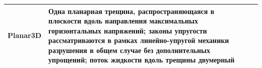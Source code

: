 \begin{longtable}[l]{|L{2.2cm}|m{7.3cm}|L{6.2cm}|}
	Planar3D&Одна планарная трещина, распространяющаяся в плоскости вдоль направления максимальных горизонтальных напряжений; законы упругости рассматриваются в рамках линейно-упругой механики разрушения в общем случае без дополнительных упрощений; поток жидкости вдоль трещины двумерный&\hfill\break{}\hfill\break\\ \hline

\end{longtable}
